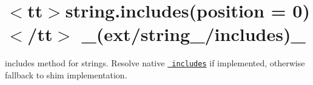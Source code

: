 \chapter{\texorpdfstring{$<$}{<}tt\texorpdfstring{$>$}{>}string.\+includes(position = 0)\texorpdfstring{$<$}{<}/tt\texorpdfstring{$>$}{>} \+\_\+(ext/string\+\_\+/includes)\+\_\+}
\hypertarget{md__2home_2solype_2delivery_2current__days_2Mannheim_2front_2node__modules_2ext_2docs_2string___2includes}{}\label{md__2home_2solype_2delivery_2current__days_2Mannheim_2front_2node__modules_2ext_2docs_2string___2includes}
\label{md__2home_2solype_2delivery_2current__days_2Mannheim_2front_2node__modules_2ext_2docs_2string___2includes_autotoc_md2583}%
%
 {\ttfamily includes} method for strings. Resolve native \href{https://developer.mozilla.org/en-US/docs/Web/JavaScript/Reference/Global_Objects/String/includes}{\texttt{ includes}} if implemented, otherwise fallback to shim implementation.


\begin{DoxyCode}{0}
\DoxyCodeLine{}

\end{DoxyCode}
 